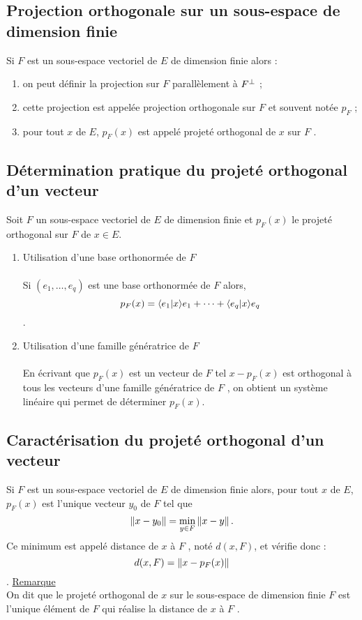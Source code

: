 \subsection{Projection orthogonale sur un sous-espace de dimension finie}
\begin{defprop}
    Si \(F\) est un sous-espace vectoriel de \(E\) de dimension finie alors :
    \begin{enumerate}
        \item on peut définir la projection sur \(F\) parallèlement à \(F^{\perp}\) ;
        \item cette projection est appelée projection orthogonale sur \(F\) et souvent notée \(p_F\) ;
        \item pour tout \(x\) de \(E\), \(p_F (x)\) est appelé projeté orthogonal de \(x\) sur \(F\) .
    \end{enumerate}
\end{defprop}
\subsection{Détermination pratique du projeté orthogonal d’un vecteur}
\begin{defprop}
    Soit \(F\) un sous-espace vectoriel de \(E\) de dimension finie et \(p_F (x)\) le projeté orthogonal sur \(F\) de \(x \in E\).
    \begin{enumerate}
    \item Utilisation d’une base orthonormée de \(F\)\\~\\
        Si \((e_1, \dots , e_q)\) est une base orthonormée de \(F\) alors,
            \[p_F (x) = \langle e_1 | x \rangle e_1 + \dots + \langle e_q | x \rangle e_q\].
    \item Utilisation d’une famille génératrice de \(F\)\\~\\
        En écrivant que \(p_F (x)\) est un vecteur de \(F\) tel \(x - p_F (x)\) est orthogonal à tous les vecteurs d’une famille génératrice de \(F\) , on obtient un système linéaire qui permet de déterminer \(p_F (x)\).
    \end{enumerate}
\end{defprop}
\subsection{Caractérisation du projeté orthogonal d’un vecteur}
\begin{defprop}
    Si \(F\) est un sous-espace vectoriel de \(E\) de dimension finie alors, pour tout \(x\) de \(E\), \(p_F (x)\) est l’unique vecteur \(y_0\) de \(F\) tel que
    \[\left\|x - y_0\right\| = \min_{y\in F} \left\|x-y\right\| .\]
    Ce minimum est appelé distance de \(x\) à \(F\) , noté \(d(x, F )\), et vérifie donc :
    \[d(x, F ) = \left\|x - p_F (x)\right\|\] .
    \underline{Remarque}\\
    On dit que le projeté orthogonal de \(x\) sur le sous-espace de dimension finie \(F\) est l’unique élément de \(F\) qui réalise la distance de \(x\) à \(F\) .
\end{defprop}
